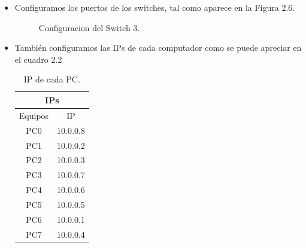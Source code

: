 \documentclass[spanish]{udpreport}
\begin{document}
\begin{itemize}
\item Configuramos los puertos de los switches, tal como aparece en la Figura 2.6.
\begin{figure}[htbp]
\centering
{}
\caption{Configuracion del Switch 3.} 
\end{figure}
\vspace{7 cm}
\item También configuramos las IPs de cada computador como se puede apreciar en el cuadro 2.2



\begin{table}[h!]
\begin{center}
\begin{tabular}{| c| |c|}
\hline
\multicolumn{2}{|c|}{IPs} \\ \hline
Equipos & IP\\
\hline \hline
PC0 & 10.0.0.8  \\ \hline
PC1 & 10.0.0.2 \\ \hline
PC2 & 10.0.0.3  \\ \hline
PC3 & 10.0.0.7 \\ \hline
PC4 & 10.0.0.6  \\ \hline
PC5 & 10.0.0.5 \\ \hline
PC6 & 10.0.0.1  \\ \hline
PC7 &  10.0.0.4 \\ \hline
\end{tabular}
\caption{IP de cada PC.}
\label{tabla:sencilla}
\end{center}
\end{table}


\end{itemize}
\end{document}
